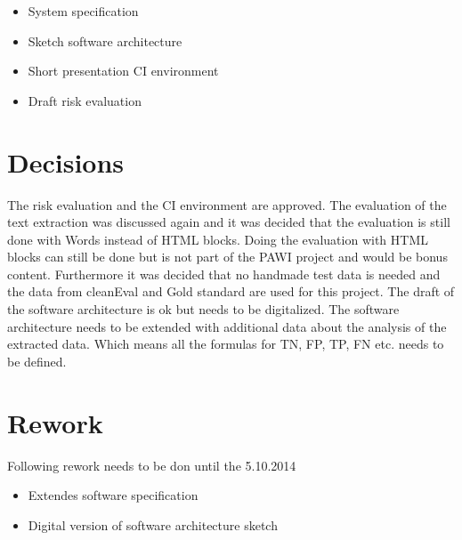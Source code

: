 \begin{itemize}
\item System specification
\item Sketch software architecture
\item Short presentation CI environment
\item Draft risk evaluation
\end{itemize}

\section{Decisions}

The risk evaluation and the CI environment are approved. 
The evaluation of the text extraction was discussed again and it was decided that the evaluation is still done with Words instead of HTML blocks. Doing the evaluation with HTML blocks can still be done but is not part of the PAWI project and would be bonus content. 
Furthermore it was decided that no handmade test data is needed and the data from cleanEval and Gold standard are used for this project.
The draft of the software architecture is ok but needs to be digitalized.
The software architecture needs to be extended with additional data about the analysis of the extracted data. Which means all the formulas for TN, FP, TP, FN etc. needs to be defined.


\section{Rework}

Following rework needs to be don until the 5.10.2014

\begin{itemize}
\item Extendes software specification
\item Digital version of software architecture sketch
\end{itemize}




